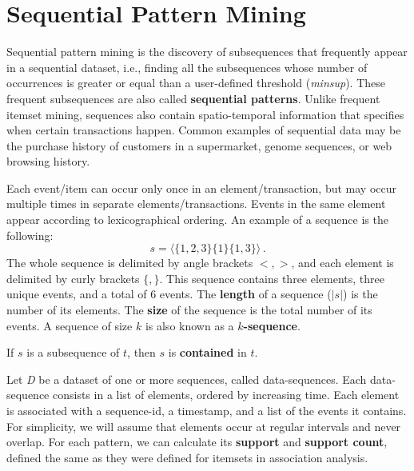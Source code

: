 \chapter{Sequential Pattern Mining}

Sequential pattern mining is the discovery of subsequences that frequently appear in a sequential dataset, i.e., finding all the subsequences whose number of occurrences is greater or equal than a user-defined threshold (\textit{minsup}). These frequent subsequences are also called \textbf{sequential patterns}. Unlike frequent itemset mining, sequences also contain spatio-temporal information that specifies when certain transactions happen. Common examples of sequential data may be the purchase history of customers in a supermarket, genome sequences, or web browsing history. 

Each event/item can occur only once in an element/transaction, but may occur multiple times in separate elements/transactions. Events in the same element appear according to lexicographical ordering. An example of a sequence is the following:
\begin{equation*}
    s = \langle \{1, 2, 3\} \{1\} \{1, 3\} \rangle \,.
\end{equation*}
The whole sequence is delimited by angle brackets $<,>$, and each element is delimited by curly brackets $\{,\}$.
This sequence contains three elements, three unique events, and a total of 6 events.
The \textbf{length} of a sequence ($|s|$) is the number of its elements. The \textbf{size} of the sequence is the total number of its events. A sequence of size $k$ is also known as a \textbf{$k$-sequence}.

If $s$ is a subsequence of $t$, then $s$ is \textbf{contained} in $t$.

Let \textit{D} be a dataset of one or more sequences, called data-sequences. Each data-sequence consists in a list of elements, ordered by increasing time. Each element is associated with a sequence-id, a timestamp, and a list of the events it contains. For simplicity, we will assume that elements occur at regular intervals and never overlap. For each pattern, we can calculate its \textbf{support} and \textbf{support count}, defined the same as they were defined for itemsets in association analysis.

